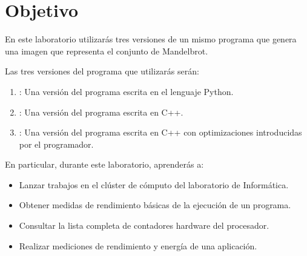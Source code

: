 \section{Objetivo}

En este laboratorio utilizarás tres versiones de un mismo programa
que genera una imagen que representa el conjunto de Mandelbrot.

Las tres versiones del programa que utilizarás serán:

\begin{enumerate}
  \item {}: Una versión del programa escrita en el lenguaje Python.
  \item {}: Una versión del programa escrita en C++.
  \item {}: Una versión del programa escrita en C++
        con optimizaciones introducidas por el programador.
\end{enumerate}

En particular, durante este laboratorio, aprenderás a:


\begin{itemize}

  \item Lanzar trabajos en el clúster de cómputo del laboratorio de Informática.
  \item Obtener medidas de rendimiento básicas de la ejecución de un programa.
  \item Consultar la lista completa de contadores hardware del procesador.
  \item Realizar mediciones de rendimiento y energía de una aplicación.
\end{itemize}
